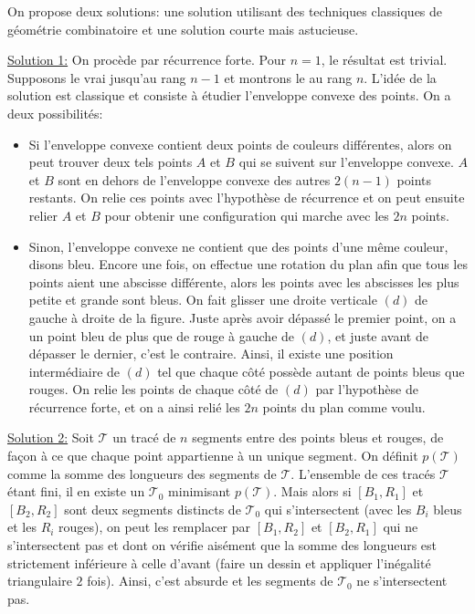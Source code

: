 \begin{sol}
On propose deux solutions: une solution utilisant des techniques classiques de géométrie combinatoire et une solution courte mais astucieuse.

\medskip

\underline{Solution 1:} On procède par récurrence forte. Pour $n=1$, le résultat est trivial. Supposons le vrai jusqu'au rang $n-1$ et montrons le au rang $n$. L'idée de la solution est classique et consiste à étudier l'enveloppe convexe des points. On a deux possibilités:
\begin{itemize}
    \item Si l'enveloppe convexe contient deux points de couleurs différentes, alors on peut trouver deux tels points $A$ et $B$ qui se suivent sur l'enveloppe convexe. $A$ et $B$ sont en dehors de l'enveloppe convexe des autres $2(n-1)$ points restants. On relie ces points avec l'hypothèse de récurrence et on peut ensuite relier $A$ et $B$ pour obtenir une configuration qui marche avec les $2n$ points.
    \item Sinon, l'enveloppe convexe ne contient que des points d'une même couleur, disons bleu. Encore une fois, on effectue une rotation du plan afin que tous les points aient une abscisse différente, alors les points avec les abscisses les plus petite et grande sont bleus. On fait glisser une droite verticale $(d)$ de gauche à droite de la figure. Juste après avoir dépassé le premier point, on a un point bleu de plus que de rouge à gauche de $(d)$, et juste avant de dépasser le dernier, c'est le contraire. Ainsi, il existe une position intermédiaire de $(d)$ tel que chaque côté possède autant de points bleus que rouges. On relie les points de chaque côté de $(d)$ par l'hypothèse de récurrence forte, et on a ainsi relié les $2n$ points du plan comme voulu.
\end{itemize}

\medskip

\underline{Solution 2:} Soit $\mathcal{T}$ un tracé de $n$ segments entre des points bleus et rouges, de façon à ce que chaque point appartienne à un unique segment. On définit $p(\mathcal{T})$ comme la somme des longueurs des segments de $\mathcal{T}$. L'ensemble de ces tracés $\mathcal{T}$ étant fini, il en existe un $\mathcal{T}_0$ minimisant $p(\mathcal{T})$. Mais alors si $[B_1,R_1]$ et $[B_2,R_2]$ sont deux segments distincts de $\mathcal{T}_0$ qui s'intersectent (avec les $B_i$ bleus et les $R_i$ rouges), on peut les remplacer par $[B_1,R_2]$ et $[B_2,R_1]$ qui ne s'intersectent pas et dont on vérifie aisément que la somme des longueurs est strictement inférieure à celle d'avant (faire un dessin et appliquer l'inégalité triangulaire $2$ fois). Ainsi, c'est absurde et les segments de $\mathcal{T}_0$ ne s'intersectent pas.
\end{sol}


